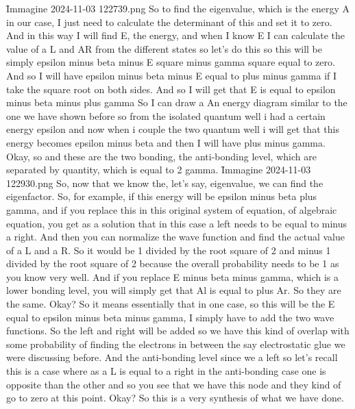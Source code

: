 \f{Immagine 2024-11-03 122739.png}
So to find the eigenvalue, which is the energy A in our case, I just need to calculate the determinant of this and set it to zero. And in this way I will find E, the energy, and when I know E I can calculate the value of a L and AR from the different states so let's do this so this will be simply epsilon minus beta minus E square minus gamma square equal to zero. And so I will have epsilon minus beta minus E equal to plus minus gamma if I take the square root on both sides. And so I will get that E is equal to epsilon minus beta minus plus gamma So I can draw a An energy diagram similar to the one we have shown before so from the isolated quantum well i had a certain energy epsilon and now when i couple the two quantum well i will get that this energy becomes epsilon minus beta and then I will have plus minus gamma. Okay, so and these are the two bonding, the anti-bonding level, which are separated by quantity, which is equal to 2 gamma.
\f{Immagine 2024-11-03 122930.png}
So, now that we know the, let's say, eigenvalue, we can find the eigenfactor. So, for example, if this energy will be epsilon minus beta plus gamma, and if you replace this in this original system of equation, of algebraic equation, you get as a solution that in this case a left needs to be equal to minus a right. And then you can normalize the wave function and find the actual value of a L and a R. So it would be 1 divided by the root square of 2 and minus 1 divided by the root square of 2 because the overall probability needs to be 1 as you know very well. And if you replace E minus beta minus gamma, which is a lower bonding level, you will simply get that Al is equal to plus Ar. So they are the same. Okay?
So it means essentially that in one case, so this will be the E equal to epsilon minus beta minus gamma, I simply have to add the two wave functions. So the left and right will be added so we have this kind of overlap with some probability of finding the electrons in between the say electrostatic glue we were discussing before. And the anti-bonding level since we a left so let's recall this is a case where as a L is equal to a right in the anti-bonding case one is opposite than the other and so you see that we have this node and they kind of go to zero at this point. Okay? So this is a very synthesis of what we have done.
